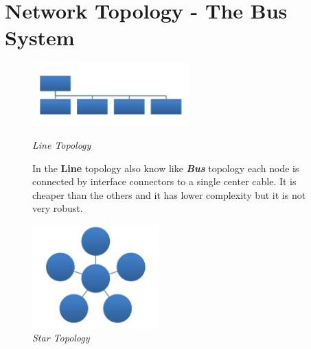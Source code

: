 \section{Network Topology - The Bus System}
\begin{figure}[h]
    \centering
    \begin{minipage}[t]{0.3\textwidth}
        \centering
        \includegraphics[width=\textwidth]{img/line}
        \caption{\textit{Line Topology}}
        
        \begin{flushleft}
            In the \textbf{Line} topology also know like \textbf{\textit{Bus}} topology each node is connected by interface connectors to a single center cable. It is cheaper than the others and it has lower complexity but it is not very robust.
        \end{flushleft}

    \end{minipage}
    \begin{minipage}[t]{0.3\textwidth}
        \centering
        \includegraphics[width=\textwidth]{img/star}
        \caption{\textit{Star Topology}}
        

\end{minipage}
\end{figure}
